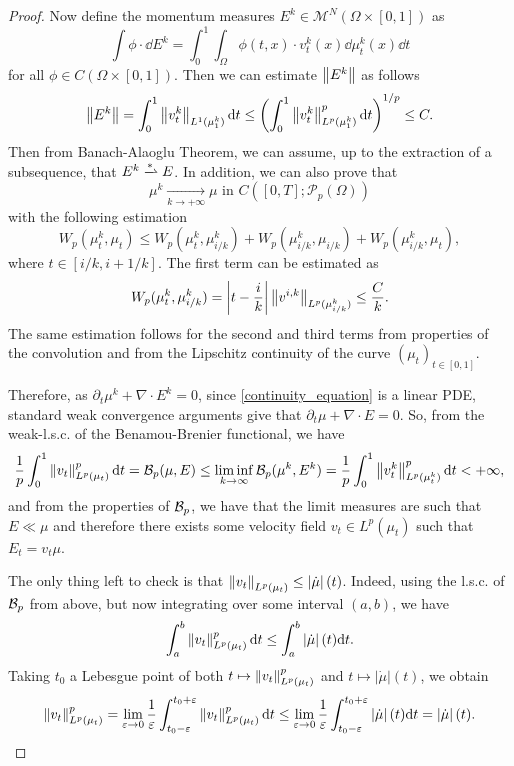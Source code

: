 \begin{proof}
	Now define the momentum measures $E^k \in \mathcal{M}^N\left(\Omega \times [0,1]\right)$ as 
	$$
		\int \phi\cdot \dd E^k = \int_0^1\int_{\Omega} \phi(t,x)\cdot v^k_t(x)\dd \mu^k_t(x)\dd t
	$$
	for all $\phi \in C\left(\Omega \times [0,1]\right).$ Then we can estimate $\left\lVert E^k\right\rVert$ as follows 
	$$
	\left\lVert E^k\right\rVert = \int_0^1\left\lVert v^k_t\right\rVert_{L^1(\mu^k_1)}{\rm d} t \le \left(\int_0^1\left\lVert v^k_t\right\rVert^p_{L^p(\mu^k_1)}{\rm d} t\right)^{1/p} \le C. 
	$$
	Then from Banach-Alaoglu Theorem, we can assume, up to the extraction of a subsequence, that $E^k \xrightharpoonup{*} E$. In addition, we can also prove that 
	$$\mu^k \xrightarrow[k\to +\infty]{} \mu \text{ in $C\left([0,T]; \mathcal{P}_p(\Omega)\right)$}$$
	with the following estimation 
	$$
	W_p(\mu^k_t, \mu_t) \le W_p(\mu^k_t, \mu^k_{i/k}) + W_p(\mu^k_{i/k}, \mu_{i/k}) + W_p(\mu^k_{i/k}, \mu_t),
	$$
	where $t \in [i/k, i+1/k]$. The first term can be estimated as 
	$$
		W_p(\mu^k_t, \mu^k_{i/k}) = \left|t - \frac{i}{k}\right|\left\lVert v^{i,k}\right\rVert_{L^p(\mu^k_{i/k})} \le \frac{C}{k}. 
	$$
	The same estimation follows for the second and third terms from properties of the convolution and from the Lipschitz continuity of the curve $(\mu_t)_{t \in [0,1]}$. 
	
	Therefore, as $\partial_t \mu^k + \nabla\cdot E^k = 0$, since \eqref{continuity_equation} is a linear PDE, standard weak convergence arguments give that $\partial_t \mu + \nabla \cdot E = 0$. So, from the weak-l.s.c. of the Benamou-Brenier functional, we have 
	$$
	\frac{1}{p}\int_0^1\left\lVert v_t\right\rVert^p_{L^p(\mu_t)}{\rm d} t = \mathcal{B}_p(\mu, E) \le \liminf_{k \to \infty} \mathcal{B}_p(\mu^k, E^k) = \frac{1}{p}\int_0^1\left\lVert v_t^k\right\rVert^p_{L^p(\mu_t^k)}{\rm d} t < +\infty, 
	$$  
	and from the properties of $\mathcal{B}_p$, we have that the limit measures are such that $E \ll \mu$ and therefore there exists some velocity field $v_t \in L^p(\mu_t)$ such that $E_t = v_t\mu$. 
	
	The only thing left to check is that $\left\lVert v_t\right\rVert_{L^p(\mu_{t})} \le \left|\dot{\mu}\right|(t)$. Indeed, using the l.s.c. of $\mathcal{B}_p$ from above, but now integrating over some interval $(a,b)$, we have 
	$$
		\int_a^b\left\lVert v_t\right\rVert^p_{L^p(\mu_t)}{\rm d} t \le \int_a^b\left|\dot{\mu}\right|(t){\rm d} t.
	$$
	Taking $t_0$ a Lebesgue point of both $t \mapsto \left\lVert v_t\right\rVert^p_{L^p(\mu_t)}$ and $t \mapsto \left|\dot{\mu}\right|(t)$, we obtain
	$$
	\left\lVert v_t\right\rVert^p_{L^p(\mu_t)} = 
	\lim_{\varepsilon \to 0} 
	\frac{1}{\varepsilon}
	\int_{t_0 - \varepsilon}^{t_0 + \varepsilon}\left\lVert v_t\right\rVert^p_{L^p(\mu_t)}{\rm d} t 
	\le 
	\lim_{\varepsilon \to 0}
	\frac{1}{\varepsilon}
	\int_{t_0 - \varepsilon}^{t_0 + \varepsilon}\left|\dot{\mu}\right|(t){\rm d} t 
	= \left|\dot{\mu}\right|(t).
	$$
	

\end{proof}
